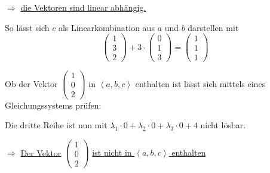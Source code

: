 \documentclass{scrreprt}
\newcommand\hull[1]{\left\langle #1 \right\rangle}
\begin{document}
\begin{enumerate}[(a)]
  $\Rightarrow$ \underline{die Vektoren sind linear abhängig.}

  So lässt sich $c$ als Linearkombination aus $a$ und $b$ darstellen mit
  \[
    \begin{pmatrix} 1 \\ 3 \\ 2 \end{pmatrix} +
    3 \cdot \begin{pmatrix} 0 \\ 1 \\ 3 \end{pmatrix}
    = \begin{pmatrix} 1 \\ 1 \\ 1 \end{pmatrix}
  \]

  \newpage
  Ob der Vektor $\begin{pmatrix} 1 \\ 0 \\ 2\end{pmatrix}$ in $\hull{a, b, c}$
  enthalten ist lässt sich mittels eines Gleichungssystems prüfen:

  Die dritte Reihe ist nun mit
  $\lambda_1 \cdot 0 + \lambda _2 \cdot 0 + \lambda_3 \cdot 0 + 4$
  nicht lösbar.

  $\Rightarrow$ \underline{Der Vektor}
  $\begin{pmatrix} 1 \\ 0 \\ 2\end{pmatrix}$
  \underline{ist nicht in $\hull{a, b, c}$ enthalten}


\end{enumerate}
\end{document}
